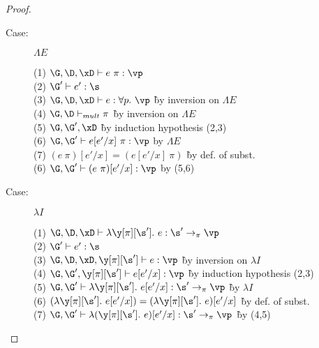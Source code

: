 \begin{proof}
\begin{description}
\item[Case:] $\Lambda E$
\begin{tabbing}
    (1) $\G, \D, \xD \vdash e~\pi : \vp$\\
    (2) $\G' \vdash e' : \s$\\
    (3) $\G, \D, \xD \vdash e : \forall p.~\vp$ \` by inversion on $\Lambda E$\\
    (4) $\G, \D \vdash_{mult} \pi$ \` by inversion on $\Lambda E$\\
    (5) $\G, \G', \xD$ \` by induction hypothesis (2,3)\\
    (6) $\G, \G' \vdash e[e'/x]~\pi : \vp$ by $\Lambda E$\\
    (7) $(e~\pi)[e'/x] = (e[e'/x]~\pi)$ \` by def. of subst.\\
    (6) $\G, \G' \vdash (e~\pi)[e'/x] : \vp$ by (5,6)\\
\end{tabbing}

\item[Case:] $\lambda I$
\begin{tabbing}
    (1) $\G, \D, \xD \vdash \lambda \y[\pi][\s'].~e : \s' \to_\pi \vp$\\
    (2) $\G' \vdash e' : \s$\\
    (3) $\G, \D, \xD, \y[\pi][\s'] \vdash e : \vp$ \` by inversion on $\lambda I$\\
    (4) $\G, \G', \y[\pi][\s'] \vdash e[e'/x] : \vp$ \` by induction hypothesis (2,3)\\
    (5) $\G, \G' \vdash \lambda \y[\pi][\s'].~e[e'/x] : \s' \to_\pi \vp$ \` by $\lambda I$\\
    (6) $(\lambda \y[\pi][\s'].~e[e'/x]) = (\lambda \y[\pi][\s'].~e)[e'/x]$ \` by def. of subst.\\
    (7) $\G, \G' \vdash \lambda (\y[\pi][\s'].~e)[e'/x] : \s' \to_\pi \vp$ \` by (4,5)\\
\end{tabbing}


\end{description}
\end{proof}
